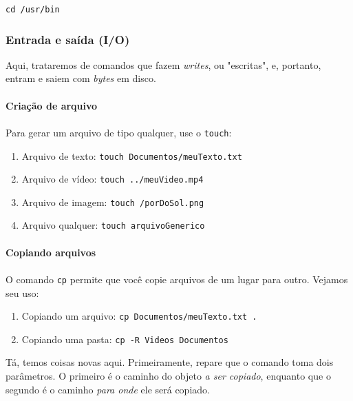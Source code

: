 \documentclass{article}
\begin{document}
	\vspace{1ex}
	\texttt{cd /usr/bin} 
	\vspace{1ex}

	\subsubsection{Entrada e saída (I/O)}

	Aqui, trataremos de comandos que fazem \textit{writes}, ou "escritas", e, portanto, entram e saiem com \textit{bytes} em disco. 

	\paragraph{Criação de arquivo} 
	\paragraph{}
	Para gerar um arquivo de tipo qualquer, use o \texttt{touch}: 
	
	\begin{enumerate} 
		\item{Arquivo de texto: \texttt{touch Documentos/meuTexto.txt}} 
		\item{Arquivo de vídeo: \texttt{touch ../meuVideo.mp4}}
		\item{Arquivo de imagem: \texttt{touch /porDoSol.png}}
		\item{Arquivo qualquer: \texttt{touch arquivoGenerico}}
	\end{enumerate}

	\paragraph{Copiando arquivos} 
	\paragraph{} 
	O comando \texttt{cp} permite que você copie arquivos de um lugar para outro. Vejamos seu uso: 
	\begin{enumerate} 
		\item{Copiando um arquivo: \texttt{cp Documentos/meuTexto.txt .}}
		\item{Copiando uma pasta: \texttt{cp -R Videos Documentos}}
	\end{enumerate} 


	Tá, temos coisas novas aqui. Primeiramente, repare que o comando toma dois parâmetros. O primeiro é 
	o caminho do objeto \textit{a ser copiado}, enquanto que o segundo é o caminho \textit{para onde} ele será copiado. 
	
\end{document}
